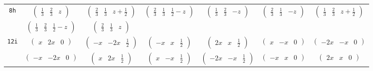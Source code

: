 \documentclass[fleqn,9pt,landscape]{jsarticle}
\begin{document}
\begin{center}
\begin{longtable}{ccccccc}
{\tt 8h} & $ \begin{pmatrix} \frac{1}{3} & \frac{2}{3} & z \end{pmatrix} $ & $ \begin{pmatrix} \frac{2}{3} & \frac{1}{3} & z + \frac{1}{2} \end{pmatrix} $ & $ \begin{pmatrix} \frac{2}{3} & \frac{1}{3} & \frac{1}{2} - z \end{pmatrix} $ & $ \begin{pmatrix} \frac{1}{3} & \frac{2}{3} & - z \end{pmatrix} $ & $ \begin{pmatrix} \frac{2}{3} & \frac{1}{3} & - z \end{pmatrix} $ & $ \begin{pmatrix} \frac{1}{3} & \frac{2}{3} & z + \frac{1}{2} \end{pmatrix} $ \\
& $ \begin{pmatrix} \frac{1}{3} & \frac{2}{3} & \frac{1}{2} - z \end{pmatrix} $ & $ \begin{pmatrix} \frac{2}{3} & \frac{1}{3} & z \end{pmatrix} $ & $  $ & $  $ & $  $ & $  $ \\ \hline
{\tt 12i} & $ \begin{pmatrix} x & 2 x & 0 \end{pmatrix} $ & $ \begin{pmatrix} - x & - 2 x & \frac{1}{2} \end{pmatrix} $ & $ \begin{pmatrix} - x & x & \frac{1}{2} \end{pmatrix} $ & $ \begin{pmatrix} 2 x & x & \frac{1}{2} \end{pmatrix} $ & $ \begin{pmatrix} x & - x & 0 \end{pmatrix} $ & $ \begin{pmatrix} - 2 x & - x & 0 \end{pmatrix} $ \\
& $ \begin{pmatrix} - x & - 2 x & 0 \end{pmatrix} $ & $ \begin{pmatrix} x & 2 x & \frac{1}{2} \end{pmatrix} $ & $ \begin{pmatrix} x & - x & \frac{1}{2} \end{pmatrix} $ & $ \begin{pmatrix} - 2 x & - x & \frac{1}{2} \end{pmatrix} $ & $ \begin{pmatrix} - x & x & 0 \end{pmatrix} $ & $ \begin{pmatrix} 2 x & x & 0 \end{pmatrix} $ \\ \hline

\end{longtable}
\end{center}
\end{document}

